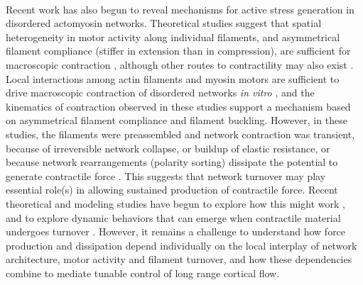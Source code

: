 \documentclass[10pt,letterpaper]{article}
\begin{document}
\paragraph{} Recent work has also begun to reveal mechanisms for active stress generation in disordered actomyosin networks. Theoretical studies suggest that spatial heterogeneity in motor activity along individual filaments, and asymmetrical filament compliance (stiffer in extension than in compression), are sufficient for macroscopic contraction \cite{1367-2630-14-3-033037,PhysRevX.4.041002}, although other routes to contractility may also exist \cite{PhysRevX.4.041002}.  Local interactions among actin filaments and myosin motors are sufficient to drive macroscopic contraction of disordered networks {\em in vitro} \cite{rheo_2D1}, and the kinematics of contraction observed in these studies support a mechanism based on asymmetrical filament compliance and filament buckling.  However, in these studies, the filaments were preassembled and network contraction was transient, because of irreversible network collapse\cite{Alvarado:2013aa}, or buildup of elastic resistance\cite{Murrell15062014}, or because network rearrangements (polarity sorting) dissipate the potential to generate contractile force \cite{Ennomani2016616,Reymann1310,Ndlec:1997aa,Surrey1167}. This suggests that network turnover may play essential role(s) in allowing sustained production of contractile force. Recent theoretical and modeling studies have begun to explore how this might work \cite{2015arXiv150706182H,Mak:2016aa,10.1371/journal.pone.0000696}, and to explore dynamic behaviors that can emerge when contractile material undergoes turnover \cite{PhysRevLett.103.058102,PhysRevLett.113.148102}. However, it remains a challenge to understand how force production and dissipation depend individually on the local interplay of network architecture, motor activity and filament turnover, and how these dependencies combine to mediate tunable control of long range cortical flow. 
\end{document}
